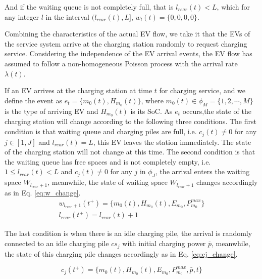 \documentclass[preprint,12pt]{elsarticle}
\begin{document}
And if the waiting queue is not completely full, that is $l_{rear}(t)<L$,
which for any integer $l$ in the interval $(l_{rear}(t),L]$, $w_{l}(t)=\{0,0,0,0\}$.

Combining the characteristics of the actual EV flow, we take it that
the EVs of the service system arrive at the charging station randomly
to request charging service. Considering the independence of the EV
arrival events, the EV flow has assumed to follow a non-homogeneous
Poisson process with the arrival rate $\lambda(t)$. 

If an EV arrives at the charging station at time $t$ for charging
service, and we define the event as $e_{t}=\{m_{0}(t),H_{m_{0}}(t)\}$, where $m_{0}(t)\in\phi_{M}=\{1,2,\cdots,M\}$
is the type of arriving EV and $H_{m_{0}}(t)$ is its SoC. As $e_{t}$
occurs,the state of the charging station will change according to
the following three conditions. The first condition is that waiting
queue and charging piles are full, i.e. $c_{j}(t)\neq0$ for any $j\in [1,J]$
and $l_{rear}(t)=L$, this EV leaves the station immediately. The
state of the charging station will not change at this time. The second
condition is that the waiting queue has free spaces and is not completely
empty, i.e. $1\leq l_{rear}(t)<L$ and $c_{j}(t)\neq0$ for any $j$
in $\phi_{J}$, the arrival enters the waiting space $W_{l_{rear}+1}$,
meanwhile, the state of waiting space $W_{l_{rear}+1}$ changes accordingly
as in Eq. \ref{eq:w_change}.
\begin{equation}
\begin{array}{c}
w_{l_{rear}+1}(t^{+})=\{m_{0}(t),H_{m_{0}}(t),E_{m_{0}},P^{max}_{m_{0}}\}\\
l_{rear}(t^{+})= l_{rear}(t)+1
\end{array}\label{eq:w_change}
\end{equation}

The last condition is when there is an idle charging pile, the arrival is randomly connected to an idle charging pile $cs_{j}$ with initial charging power $\overline{p}$, meanwhile, the state of this charging pile changes accordingly as in Eq. \ref{eq:cj_change}.

\begin{equation}
c_{j}(t^{+})=\{m_{0}(t),H_{m_{0}}(t),E_{m_{0}},P_{m_{0}}^{max},\bar{p},t\}\label{eq:cj_change}
\end{equation}
\end{document}
